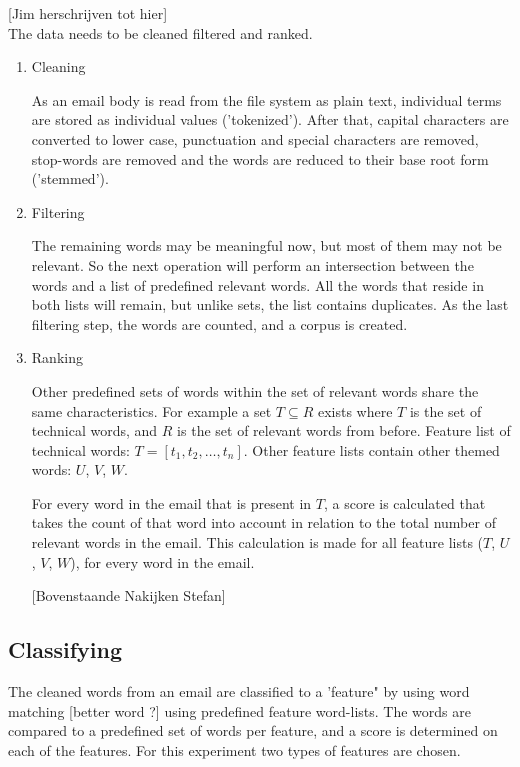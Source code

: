 \documentclass[journal]{IEEEtran}
\begin{document}
[Jim herschrijven tot hier]\\

The data needs to be cleaned filtered and ranked.

\begin{enumerate}
    \item Cleaning

    As an email body is read from the file system as plain text, individual terms are stored as individual values ('tokenized'). After that, capital characters are converted to lower case, punctuation and special characters are removed, stop-words are removed and the words are reduced to their base root form ('stemmed'). 

    \item Filtering

    The remaining words may be meaningful now, but most of them may not be 
    relevant. So the next operation will perform an intersection between the 
    words and a list of predefined relevant words. All the words that reside 
    in both lists will remain, but unlike sets, the list contains duplicates.
    As the last filtering step, the words are counted, and a corpus is created.

    \item Ranking

    Other predefined sets of words within the set of relevant words share the 
    same characteristics. For example a set $T \subseteq R$ exists where $T$ 
    is the set of technical words, and $R$ is the set of relevant words from 
    before. Feature list of technical words: $T = [t_1, t_2, \dots, t_n]$. 
    Other feature lists contain other themed words: $U$, $V$, $W$.

    For every word in the email that is present in $T$, a score is calculated 
    that takes the count of that word into account in relation to the total 
    number of relevant words in the email. This calculation is made for all 
    feature lists ($T$, $U$, $V$, $W$), for every word in the email.

    [Bovenstaande Nakijken Stefan]
    
\end{enumerate}
    
\subsection{Classifying}

    The cleaned words from an email are classified to a 'feature" by using word matching [better word ?] using predefined feature word-lists. The words are compared to a predefined set of words per feature, and a score is determined on each of the features. For this experiment two types of features are chosen. 
    
\end{document}
